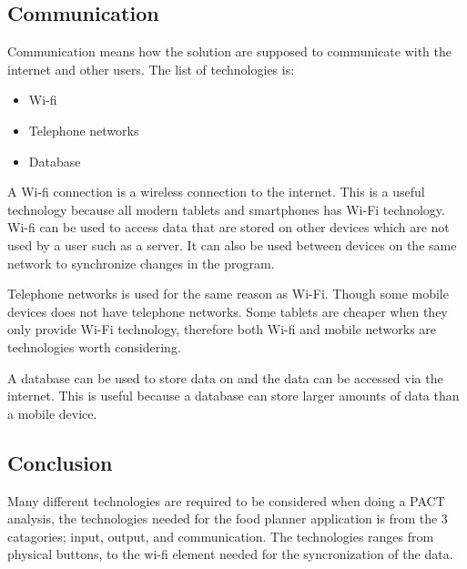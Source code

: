 \subsection{Communication}

Communication means how the solution are supposed to communicate with the internet and other users. The list of technologies is:

\begin{itemize}
	\item Wi-fi
	\item Telephone networks    
    \item Database
\end{itemize}

A Wi-fi connection is a wireless connection to the internet.
This is a useful technology because all modern tablets and smartphones has Wi-Fi technology.
Wi-fi can be used to access data that are stored on other devices which are not used by a user such as a server.
It can also be used between devices on the same network to synchronize changes in the program.    


Telephone networks is used for the same reason as Wi-Fi. Though some mobile devices does not have telephone networks.
Some tablets are cheaper when they only provide Wi-Fi technology, therefore both Wi-fi and mobile networks are technologies worth considering.

A database can be used to store data on and the data can be accessed via the internet.
This is useful because a database can store larger amounts of data than a mobile device.
 
\subsection{Conclusion}

Many different technologies are required to be considered when doing a PACT analysis, the technologies needed for the food planner application is from the 3 catagories; input, output, and communication.
The technologies ranges from physical buttons, to the wi-fi element needed for the syncronization of the data.
